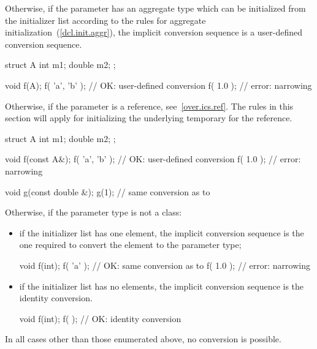 \pnum
Otherwise, if the parameter has an aggregate type which can be initialized from
the initializer list according to the rules for aggregate
initialization~(\ref{dcl.init.aggr}), the implicit conversion sequence is a
user-defined conversion sequence. \enterexample
\begin{codeblock}
struct A {
  int m1;
  double m2;
};

void f(A);
f( {'a', 'b'} );            // OK:  user-defined conversion 
f( {1.0} );                 // error: narrowing
\end{codeblock}
\exitexample

\pnum
Otherwise, if the parameter is a reference, see~\ref{over.ics.ref}. \enternote
The rules in this section will apply for initializing the underlying temporary
for the reference. \exitnote \enterexample
\begin{codeblock}
struct A {
  int m1;
  double m2;
};

void f(const A&);
f( {'a', 'b'} );            // OK:  user-defined conversion 
f( {1.0} );                 // error: narrowing

void g(const double &);
g({1});                     // same conversion as  to 
\end{codeblock}
\exitexample

\pnum
Otherwise, if the parameter type is not a class:

\begin{itemize}
\item if the initializer list has one element, the implicit conversion sequence
is the one required to convert the element to the parameter type; \enterexample
\begin{codeblock}
void f(int);
f( {'a'} );                 // OK: same conversion as  to 
f( {1.0} );                 // error: narrowing
\end{codeblock}
\exitexample

\item if the initializer list has no elements, the implicit conversion sequence
is the identity conversion. \enterexample
\begin{codeblock}
void f(int);
f( { } );                   // OK: identity conversion 
\end{codeblock}
\exitexample
\end{itemize}

\pnum
In all cases other than those enumerated above, no conversion is possible.

